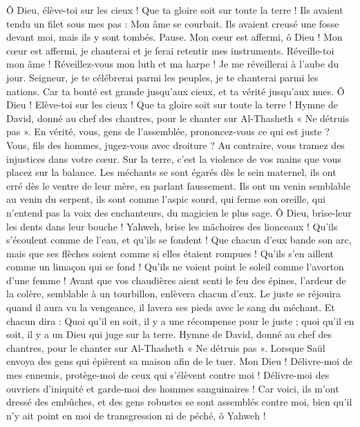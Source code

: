 \begin{multicols}{2}
Ô Dieu, élève-toi sur les cieux ! Que ta gloire soit sur toute la terre !
Ils avaient tendu un filet sous mes pas : Mon âme se courbait. Ils avaient creusé une fosse devant moi, mais ils y sont tombés. Pause.
Mon cœur est affermi, ô Dieu ! Mon cœur est affermi, je chanterai et je ferai retentir mes instruments.
Réveille-toi mon âme ! Réveillez-vous mon luth et ma harpe ! Je me réveillerai à l'aube du jour.
Seigneur, je te célébrerai parmi les peuples, je te chanterai parmi les nations.
Car ta bonté est grande jusqu'aux cieux, et ta vérité jusqu'aux nues.
Ô Dieu ! Elève-toi sur les cieux ! Que ta gloire soit sur toute la terre !
\VerseOne{}Hymne de David, donné au chef des chantres, pour le chanter sur Al-Thasheth « Ne détruis pas ».
En vérité, vous, gens de l'assemblée, prononcez-vous ce qui est juste ? Vous, fils des hommes, jugez-vous avec droiture ?
Au contraire, vous tramez des injustices dans votre cœur. Sur la terre, c’est la violence de vos mains que vous placez sur la balance.
Les méchants se sont égarés dès le sein maternel, ils ont erré dès le ventre de leur mère, en parlant faussement.
Ils ont un venin semblable au venin du serpent, ils sont comme l'aspic sourd, qui ferme son oreille,
qui n'entend pas la voix des enchanteurs, du magicien le plus sage.
Ô Dieu, brise-leur les dents dans leur bouche ! Yahweh, brise les mâchoires des lionceaux !
Qu'ils s'écoulent comme de l'eau, et qu'ils se fondent ! Que chacun d'eux bande son arc, mais que ses flèches soient comme si elles étaient rompues !
Qu'ils s'en aillent comme un limaçon qui se fond ! Qu’ils ne voient point le soleil comme l'avorton d'une femme !
Avant que vos chaudières aient senti le feu des épines, l'ardeur de la colère, semblable à un tourbillon, enlèvera chacun d'eux.
Le juste se réjouira quand il aura vu la vengeance, il lavera ses pieds avec le sang du méchant.
Et chacun dira : Quoi qu'il en soit, il y a une récompense pour le juste ; quoi qu'il en soit, il y a un Dieu qui juge sur la terre.
\VerseOne{}Hymne de David, donné au chef des chantres, pour le chanter sur Al-Thasheth « Ne détruis pas ». Lorsque Saül envoya des gens qui épièrent sa maison afin de le tuer.
Mon Dieu ! Délivre-moi de mes ennemis, protège-moi de ceux qui s'élèvent contre moi !
Délivre-moi des ouvriers d'iniquité et garde-moi des hommes sanguinaires !
Car voici, ils m'ont dressé des embûches, et des gens robustes se sont assemblés contre moi, bien qu'il n'y ait point en moi de transgression ni de péché, ô Yahweh !

\end{multicols}
